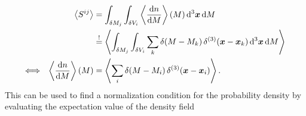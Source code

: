 \documentclass[../main.tex]{subfiles}
\begin{document}
\begin{align}
    &&\left\langle S^{ij} \right\rangle &= \int_{\delta M_j} \int_{\delta V_i}  \left\langle \frac{\mathrm{d} n}{\mathrm{d} M} \right \rangle(M) \, \mathrm{d}^3 \boldsymbol{x} \, \mathrm{d} M \\
    && &\overset{!}{=}  \left\langle \int_{\delta M_j} \int_{\delta V_i} \sum_k \delta(M-M_k)\,\delta^{(3)}(\boldsymbol{x}-\boldsymbol{x}_k)   \, \mathrm{d}^3 \boldsymbol{x} \, \mathrm{d} M \right\rangle  \\
    \Longleftrightarrow && \left\langle \frac{\mathrm{d} n}{\mathrm{d} M} \right \rangle(M) &= \left\langle \sum_i \delta(M-M_i)\,\delta^{(3)}(\boldsymbol{x}-\boldsymbol{x}_i)  \right \rangle.
\end{align}
This can be used to find a normalization condition for the probability density by evaluating the expectation value of the density field 
\end{document}
